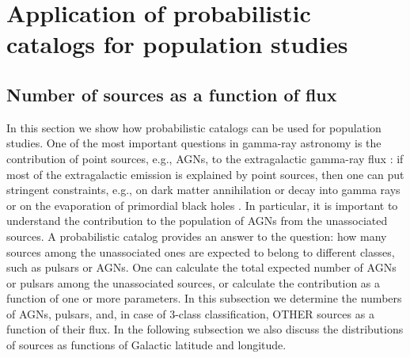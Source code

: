 \section{Application of probabilistic catalogs for population studies}

\subsection{Number of sources as a function of flux}


In this section we show how probabilistic catalogs can be used for population studies.
One of the most important questions in gamma-ray astronomy is the contribution of point sources, 
e.g., AGNs, to the extragalactic gamma-ray flux 
\citep[e.g.,][]{2010ApJ...720..435A, 2011ApJ...738..181M, 2016PhRvL.116o1105A, 2016ApJS..225...18Z, 2016ApJ...826L..31Z, 2016ApJ...832..117L, 2018ApJ...856..106D}:
if most of the extragalactic emission is explained by point sources, then one can put stringent constraints, 
e.g., on  dark matter annihilation or decay into gamma rays 
\citep{2015ApJ...800L..27A, 2015PhRvD..91l3001D, 2015JCAP...09..008F, 2015PhR...598....1F, 2017ChPhC..41d5104L} or 
on the evaporation of primordial black holes \citep{2010PhRvD..81j4019C}.
In particular, it is important to understand the contribution to the population of AGNs from the unassociated sources.
A probabilistic catalog provides an answer to the question: how many sources among the unassociated ones are expected to belong to different classes, such as pulsars or AGNs. 
One can calculate the total expected number of AGNs or pulsars among the unassociated sources, or calculate the contribution as a function of one or more parameters.
In this subsection we determine the numbers of AGNs, pulsars, and, in case of 3-class classification, OTHER sources as a function of their flux.
In the following subsection we also discuss the distributions of sources as functions
of Galactic latitude and longitude.



